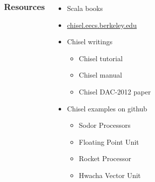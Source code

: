 \documentclass[xcolor=pdflatex,dvipsnames,table]{beamer}
\begin{document}
\begin{frame}
\begin{columns}


\frametitle{Resources}
\begin{itemize}
\item Scala books
\item \url{chisel.eecs.berkeley.edu}
\item Chisel writings
\begin{itemize}
\item Chisel tutorial
\item Chisel manual
\item Chisel DAC-2012 paper
\end{itemize}
\item Chisel examples on github
\begin{itemize}
\item Sodor Processors
\item Floating Point Unit
\item Rocket Processor
\item Hwacha Vector Unit
\end{itemize}
\end{itemize}



\end{columns}
\end{frame}
\end{document}
